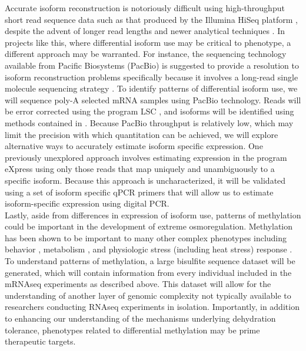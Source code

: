 \documentclass[12pt]{article}
\begin{document}
Accurate isoform reconstruction is notoriously difficult using high-throughput short read sequence data such as that produced by the Illumina HiSeq platform \citep{Pyrkosz:2013tm,Hiller:2009be}, despite the advent of longer read lengths and newer analytical techniques \citep{LeGault:2013gw,Jiang:2009bw}. In projects like this, where differential isoform use may be critical to phenotype, a different approach may be warranted. For instance, the sequencing technology available from Pacific Biosystems (PacBio) is suggested to provide a resolution to isoform reconstruction problems \citep{Au:2013hp} specifically because it involves a long-read single molecule sequencing strategy \citep{Eid:2009kva}.  To identify patterns of differential isoform use, we will sequence poly-A selected mRNA samples using PacBio technology. Reads will be error corrected using the program LSC \citep{Au:2012iq}, and isoforms will be identified using methods contained in \cite{Au:2013hp}. Because PacBio throughput is relatively low, which may limit the precision with which quantitation can be achieved, we will explore alternative ways to accurately estimate isoform specific expression. One previously unexplored approach involves estimating expression in the program eXpress \citep{Roberts:2012dh} using only those reads that map uniquely and unambiguously to a specific isoform. Because this approach is uncharacterized, it will be validated using a set of isoform specific qPCR primers that will allow us to estimate isoform-specific expression using digital PCR.  \\ 

Lastly, aside from differences in expression of isoform use, patterns of methylation could be important in the development of extreme osmoregulation. Methylation has been shown to be important to many other complex phenotypes including behavior \citep{Lyko:2010dr}, metabolism \citep{Foret:2012jf}, and physiologic stress (including heat stress) response \citep{Sonna:2002dc}. To understand patterns of methylation, a large bisulfite sequence dataset will be generated, which will contain information from every individual included in the mRNAseq experiments as described above. This dataset will allow for the understanding of another layer of genomic complexity not typically available to researchers conducting RNAseq experiments in isolation. Importantly, in addition to enhancing our understanding of the mechanisms underlying dehydration tolerance, phenotypes related to differential methylation may be prime therapeutic targets.    \\
\end{document}
